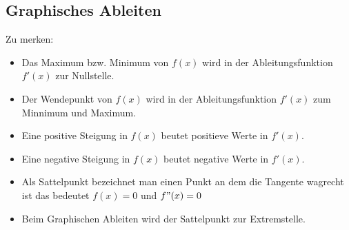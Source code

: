 \subsection{Graphisches Ableiten}

Zu merken:\\
\begin{itemize}
    \item Das Maximum bzw. Minimum von $f(x)$ wird in der Ableitungsfunktion $f'(x)$ zur Nullstelle.
    \item Der Wendepunkt von $f(x)$ wird in der Ableitungsfunktion $f'(x)$ zum Minnimum und Maximum.
    \item Eine positive Steigung in $f(x)$ beutet positieve Werte in $f'(x)$.
    \item Eine negative Steigung in $f(x)$ beutet negative Werte in $f'(x)$.
    \item Als Sattelpunkt bezeichnet man einen Punkt an dem die Tangente wagrecht ist das bedeutet $f(x) = 0$ und $f"(x) = 0$
    \item Beim Graphischen Ableiten wird der Sattelpunkt zur Extremstelle.
\end{itemize}